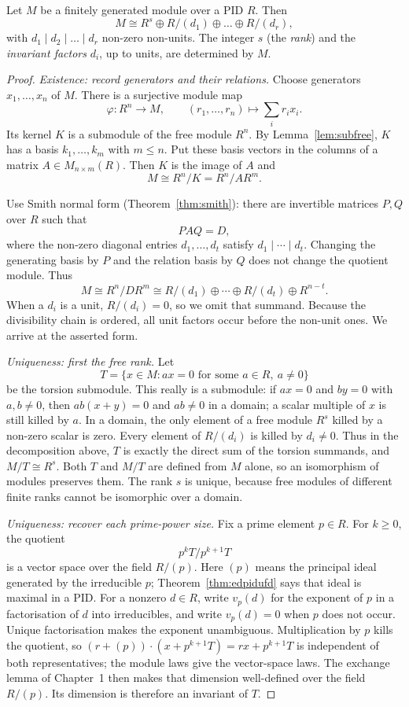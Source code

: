 \begin{theorem}\label{thm:structure}
Let $M$ be a finitely generated module over a PID $R$. Then
\[
M\cong R^s\oplus R/(d_1)\oplus\dots\oplus R/(d_r),
\]
with $d_1\mid d_2\mid\dots\mid d_r$ non-zero non-units. The integer $s$ (the \emph{rank}) and the \emph{invariant factors} $d_i$, up to units, are determined by $M$.
\end{theorem}

\begin{proof}
\emph{Existence: record generators and their relations.}
Choose generators $x_1,\ldots,x_n$ of $M$.
There is a surjective module map
\[
\varphi:R^n\to M,\qquad
(r_1,\ldots,r_n)\mapsto\sum_i r_ix_i.
\]
Its kernel $K$ is a submodule of the free
module $R^n$. By Lemma~\ref{lem:subfree},
$K$ has a basis $k_1,\ldots,k_m$ with
$m\le n$. Put these basis vectors in
the columns of a matrix $A\in M_{n\times m}(R)$.
Then $K$ is the image of $A$ and
\[
M\cong R^n/K=R^n/AR^m.
\]

Use Smith normal form (Theorem~\ref{thm:smith}):
there are invertible matrices $P,Q$
over $R$ such that
\[
PAQ=D,
\]
where the non-zero diagonal entries
$d_1,\ldots,d_t$ satisfy
$d_1\mid\cdots\mid d_t$.
Changing the generating basis by $P$
and the relation basis by $Q$
does not change the quotient module.
Thus
\[
M\cong R^n/DR^m
\cong
R/(d_1)\oplus\cdots\oplus R/(d_t)
\oplus R^{n-t}.
\]
When a $d_i$ is a unit, $R/(d_i)=0$,
so we omit that summand.
Because the divisibility chain is ordered,
all unit factors occur before the non-unit
ones. We arrive at the asserted form.

\emph{Uniqueness: first the free rank.}
Let
\[
T=\{x\in M:ax=0\text{ for some }a\in R,\ a\ne0\}
\]
be the torsion submodule. This really is a submodule: if $ax=0$ and
$by=0$ with $a,b\ne0$, then $ab(x+y)=0$ and $ab\ne0$ in a
domain; a scalar multiple of $x$ is still killed by $a$.
In a domain, the only element of a free
module $R^s$ killed by a non-zero scalar
is zero. Every element of $R/(d_i)$
is killed by $d_i\ne0$. Thus in the
decomposition above, $T$ is exactly
the direct sum of the torsion summands,
and $M/T\cong R^s$.
Both $T$ and $M/T$ are defined from
$M$ alone, so an isomorphism of modules
preserves them. The rank $s$ is unique,
because free modules of different finite
ranks cannot be isomorphic over a domain.

\emph{Uniqueness: recover each prime-power size.}
Fix a prime element $p\in R$.
For $k\ge0$, the quotient
\[
p^kT/p^{k+1}T
\]
is a vector space over the field $R/(p)$. Here $(p)$ means the principal ideal generated by the irreducible $p$; Theorem~\ref{thm:edpidufd} says that ideal is maximal in a PID. For a nonzero $d\in R$, write $v_p(d)$ for the exponent of $p$ in a factorisation of $d$ into irreducibles, and write $v_p(d)=0$ when $p$ does not occur. Unique factorisation makes the exponent unambiguous. Multiplication by $p$ kills the quotient, so
$(r+(p))\cdot(x+p^{k+1}T)=rx+p^{k+1}T$ is independent of
both representatives; the module laws give the vector-space laws.
The exchange lemma of Chapter~1 then makes that dimension well-defined over the field $R/(p)$.
Its dimension is therefore an invariant
of $T$.


\end{proof}
